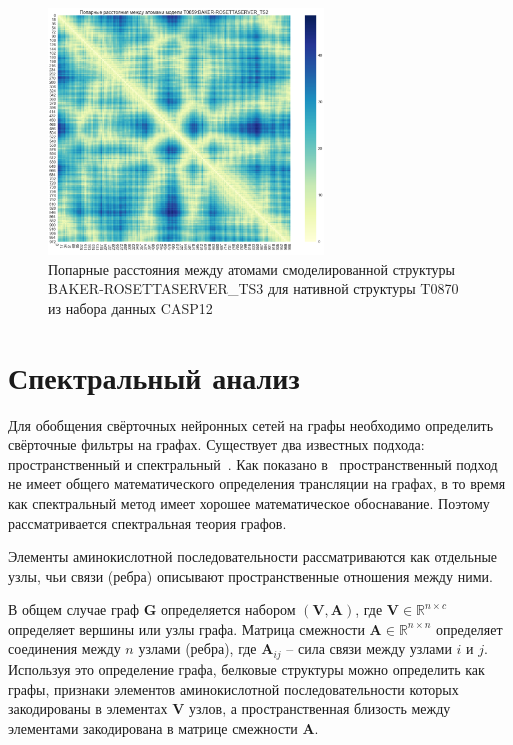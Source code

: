 \documentclass[14pt]{extarticle}
\begin{document}
\begin{figure}[H]
	\centering
	\includegraphics[width=0.65\textwidth]{pairwise.pdf}
	\caption{Попарные расстояния между атомами смоделированной структуры BAKER-ROSETTASERVER\_TS3 для нативной структуры T0870 из набора данных CASP12}
	\label{protein_vis}
\end{figure}

\section{Спектральный анализ}

Для обобщения свёрточных нейронных сетей на графы необходимо определить свёрточные фильтры на графах. Существует два известных подхода: пространственный и спектральный~\cite{DBLP:journals/corr/abs-1901-00596, DBLP:journals/corr/abs-1812-08434}. Как показано в~\cite{ae482107de73461787258f805cf8f4ed} пространственный подход не имеет общего математического определения трансляции на графах, в то время как  спектральный метод имеет хорошее математическое обоснавание. Поэтому рассматривается спектральная теория графов.

Элементы аминокислотной последовательности рассматриваются как отдельные узлы, чьи связи (ребра) описывают пространственные отношения между ними. 

В общем случае граф $\mathbf{G}$ определяется набором $\mathbf{(V, A)}$, где $\mathbf{V}\in \mathbb{R}^{n \times c}$ определяет вершины или узлы графа. Матрица смежности $\mathbf{A}\in \mathbb{R}^{n \times n}$ определяет соединения между $n$ узлами (ребра), где $\mathbf{A}_{ij}$ – сила связи между узлами $i$ и $j$. Используя это определение графа, белковые структуры можно определить как графы, признаки элементов аминокислотной последовательности которых закодированы в элементах $\mathbf{V}$ узлов, а пространственная близость между элементами закодирована в матрице смежности $\mathbf{A}$.
\end{document}

